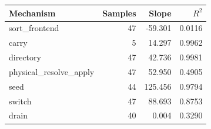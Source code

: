 \begin{tabular}{lrrr}
\toprule
Mechanism & Samples & Slope & $R^2$ \\
\midrule
sort\_frontend & 47 & -59.301 & 0.0116 \\
carry & 5 & 14.297 & 0.9962 \\
directory & 47 & 42.736 & 0.9981 \\
physical\_resolve\_apply & 47 & 52.950 & 0.4905 \\
seed & 44 & 125.456 & 0.9794 \\
switch & 47 & 88.693 & 0.8753 \\
drain & 40 & 0.004 & 0.3290 \\
\bottomrule
\end{tabular}
